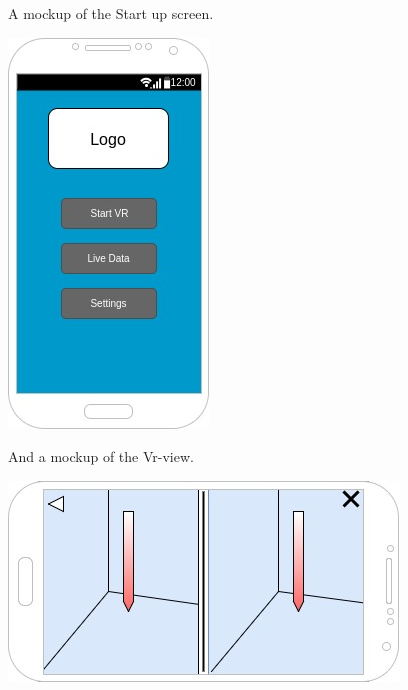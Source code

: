 A mockup of the Start up screen.

\includegraphics[scale=0.5]{pics/startScreen_mockup.jpg}

And a mockup of the Vr-view.

\includegraphics[scale=0.5]{pics/VRView_mockup.jpg}
